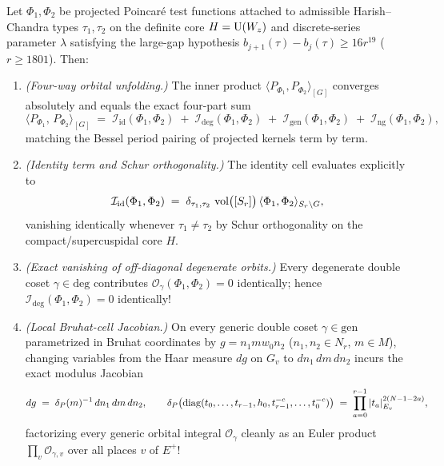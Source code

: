 \begin{theorem}
\label{thm:15:poincare-unfolding}
Let $\Phi_1, \Phi_2$ be projected Poincar\'e test functions attached to admissible Harish--Chandra types $\tau_1, \tau_2$ on the definite core $H = \mathrm{U}(W_z)$ and discrete-series parameter $\lambda$ satisfying the large-gap hypothesis $b_{j+1}(\tau) - b_j(\tau) \ge 16 r^{19}$ ($r \ge 1801$). Then:
\begin{enumerate}[label=\textup{(\roman*)}]
\item \emph{(Four-way orbital unfolding.)} The inner product $\langle P_{\Phi_1}, P_{\Phi_2} \rangle_{[G]}$ converges absolutely and equals the exact four-part sum
  \begin{equation}
  \label{eq:15:four-part-sum}
    \bigl\langle P_{\Phi_1},\, P_{\Phi_2} \bigr\rangle_{[G]}
    \;=\; \mathcal{I}_{\mathrm{id}}(\Phi_1, \Phi_2)
    \;+\; \mathcal{I}_{\mathrm{deg}}(\Phi_1, \Phi_2)
    \;+\; \mathcal{I}_{\mathrm{gen}}(\Phi_1, \Phi_2)
    \;+\; \mathcal{I}_{\mathrm{ng}}(\Phi_1, \Phi_2),
  \end{equation}
  matching the Bessel period pairing of projected kernels term by term.
\item \emph{(Identity term and Schur orthogonality.)} The identity cell evaluates explicitly to
  \begin{equation}
  \label{eq:15:id-term}
    \mathcal{I}_{\mathrm{id}}(\Phi_1, \Phi_2)
    \;=\; \delta_{\tau_1, \tau_2}\,\operatorname{vol}\bigl([S_r]\bigr)\,\langle \Phi_1, \Phi_2 \rangle_{S_r \backslash G},
  \end{equation}
  vanishing identically whenever $\tau_1 \neq \tau_2$ by Schur orthogonality on the compact/supercuspidal core $H$.
\item \emph{(Exact vanishing of off-diagonal degenerate orbits.)} Every degenerate double coset $\gamma \in \mathrm{deg}$ contributes $\mathcal{O}_\gamma(\Phi_1, \Phi_2) = 0$ identically; hence $\mathcal{I}_{\mathrm{deg}}(\Phi_1, \Phi_2) = 0$ identically!
\item \emph{(Local Bruhat-cell Jacobian.)} On every generic double coset $\gamma \in \mathrm{gen}$ parametrized in Bruhat coordinates by $g = n_1 m w_0 n_2$ ($n_1, n_2 \in N_r$, $m \in M$), changing variables from the Haar measure $dg$ on $G_v$ to $dn_1\, dm\, dn_2$ incurs the exact modulus Jacobian
  \begin{equation}
  \label{eq:15:local-jacobian}
    dg \;=\; \delta_P(m)^{-1}\, dn_1\, dm\, dn_2,
    \qquad \delta_P\bigl(\operatorname{diag}(t_0, \dots, t_{r-1}, h_0, t_{r-1}^{-c}, \dots, t_0^{-c})\bigr)
    \;=\; \prod_{a = 0}^{r-1} |t_a|_{E_v}^{2(N - 1 - 2a)},
  \end{equation}
  factorizing every generic orbital integral $\mathcal{O}_\gamma$ cleanly as an Euler product $\prod_v \mathcal{O}_{\gamma, v}$ over all places $v$ of $E^+$!
\end{enumerate}
\end{theorem}

